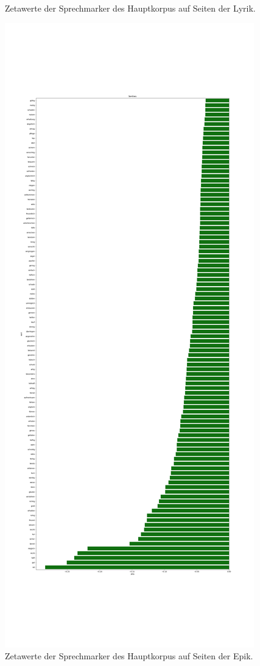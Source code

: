 \documentclass[a4paper,10p]{article}
\begin{document}
\begin{figure}{}
\begin{minipage}[b]{.45\linewidth}
        \caption{Zetawerte der Sprechmarker des Hauptkorpus auf Seiten der Lyrik.}
        \label{haupt_sprechmarker}
    \end{minipage}
    \hfill
    \begin{minipage}[b]{.45\linewidth}
        \centering
        \includegraphics[width=\linewidth]{haupt_sentiws_pro_wort2.png}
        \caption{Zetawerte der Sprechmarker des Hauptkorpus auf Seiten der Epik.}  
        \label{haupt_sprechmarker2}
    \end{minipage}
\end{figure}
\end{document}
